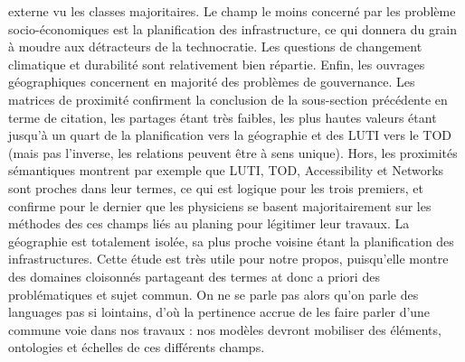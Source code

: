 {externe vu les classes majoritaires. Le champ le moins concerné par les problème socio-économiques est la planification des infrastructure, ce qui donnera du grain à moudre aux détracteurs de la technocratie. Les questions de changement climatique et durabilité sont relativement bien répartie. Enfin, les ouvrages géographiques concernent en majorité des problèmes de gouvernance. Les matrices de proximité confirment la conclusion de la sous-section précédente en terme de citation, les partages étant très faibles, les plus hautes valeurs étant jusqu'à un quart de la planification vers la géographie et des LUTI vers le TOD (mais pas l'inverse, les relations peuvent être à sens unique). Hors, les proximités sémantiques montrent par exemple que LUTI, TOD, Accessibility et Networks sont proches dans leur termes, ce qui est logique pour les trois premiers, et confirme pour le dernier que les physiciens se basent majoritairement sur les méthodes des ces champs liés au planing pour légitimer leur travaux. La géographie est totalement isolée, sa plus proche voisine étant la planification des infrastructures. Cette étude est très utile pour notre propos, puisqu'elle montre des domaines cloisonnés partageant des termes at donc a priori des problématiques et sujet commun. On ne se parle pas alors qu'on parle des languages pas si lointains, d'où la pertinence accrue de les faire parler d'une commune voie dans nos travaux : nos modèles devront mobiliser des éléments, ontologies et échelles de ces différents champs.
}



